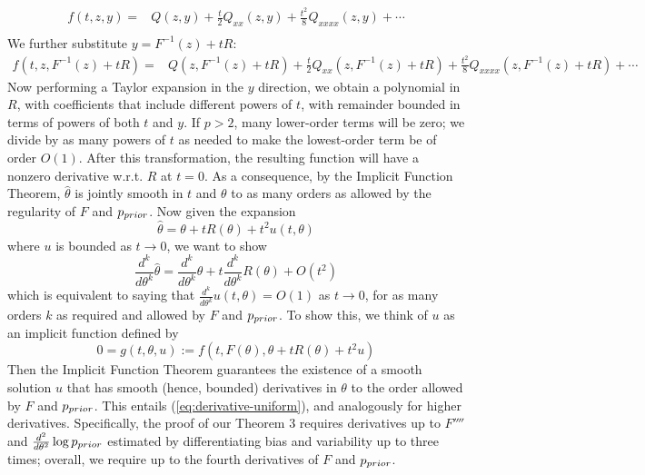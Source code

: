 \begin{align*}
f(t,z,y)=& Q(z,y) + \frac{t}{2} Q_{xx}(z,y) + \frac{t^2}{8} Q_{xxxx}(z,y)+\cdots \\
\end{align*}
We further substitute $y = F^{-1}(z) + t R$:
\begin{align*}
f(t,z,F^{-1}(z) + t R)=& Q(z,F^{-1}(z) + t R) + \frac{t}{2} Q_{xx}(z,F^{-1}(z) + t R) + \frac{t^2}{8} Q_{xxxx}(z,F^{-1}(z) + t R)+\cdots 
\end{align*}
Now performing a Taylor expansion in the $y$ direction, we obtain a polynomial in $R$, with coefficients that include different powers of $t$, with remainder bounded in terms of powers of both $t$ and $y$.
If $p>2$, many lower-order terms will be zero; we divide by as many powers of $t$ as needed to make the lowest-order term be of order $O(1)$.
After this transformation, the resulting function will have a nonzero derivative w.r.t. $R$ at $t=0$.
As a consequence, by the Implicit Function Theorem, $\widehat{\theta}$ is jointly smooth in $t$ and $\theta$ to as many orders as allowed by the regularity of $F$ and $p_{prior}$. 
Now given the expansion
\begin{equation}
    \widehat{\theta} = \theta + t R(\theta) + t^2 u(t,\theta)
\end{equation}
where $u$ is bounded as $t \rightarrow 0$, we want to show
\begin{equation}\label{eq:derivative-uniform}
    \frac{d^k}{d\theta^k} \widehat{\theta} = \frac{d^k}{d\theta^k} \theta + t \frac{d^k}{d\theta^k}R(\theta) + O(t^2)
\end{equation}
which is equivalent to saying that $\frac{d^k}{d\theta^k} u(t,\theta) = O(1)$ as $t\rightarrow 0$, for as many orders $k$ as required and allowed by $F$ and $p_{prior}$.
To show this, we think of $u$ as an implicit function defined by
\begin{equation}
    0 = g(t,\theta, u) := f(t,F(\theta), \theta + t R(\theta) + t^2 u)
\end{equation}
Then the Implicit Function Theorem guarantees the existence of a smooth solution $u$ that has smooth (hence, bounded) derivatives in $\theta$ to the order allowed by $F$ and $p_{prior}$. This entails (\ref{eq:derivative-uniform}), and analogously for higher derivatives.
Specifically, the proof of our Theorem 3 requires derivatives up to $F''''$ and $\frac{d^2}{d\theta^2} \log p_{prior}$ estimated by differentiating bias and variability up to three times; overall, we require up to the fourth derivatives of $F$ and $p_{prior}$.  
